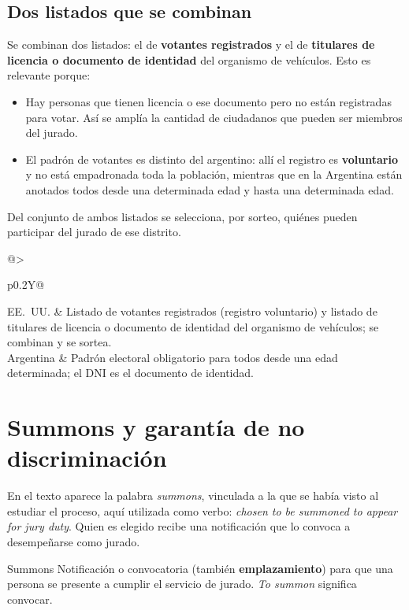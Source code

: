 \documentclass[12pt,oneside]{book}
\begin{document}
\subsection{Dos listados que se combinan}

Se combinan dos listados: el de \textbf{votantes registrados} y el de \textbf{titulares de licencia o documento de identidad} del organismo de vehículos. Esto es relevante porque:
\begin{itemize}
\item Hay personas que tienen licencia o ese documento pero no están registradas para votar. Así se amplía la cantidad de ciudadanos que pueden ser miembros del jurado.
\item El padrón de votantes es distinto del argentino: allí el registro es \textbf{voluntario} y no está empadronada toda la población, mientras que en la Argentina están anotados todos desde una determinada edad y hasta una determinada edad.
\end{itemize}

Del conjunto de ambos listados se selecciona, por sorteo, quiénes pueden participar del jurado de ese distrito.

\begin{table}[H]
\centering
\small
\renewcommand{\arraystretch}{1.25}
\begin{tabularx}{\textwidth}{@{}>{\bfseries\raggedright\arraybackslash}p{}Y@{}}
\toprule
EE.~UU. & Listado de votantes registrados (registro voluntario) y listado de titulares de licencia o documento de identidad del organismo de vehículos; se combinan y se sortea. \\
Argentina & Padrón electoral obligatorio para todos desde una edad determinada; el DNI es el documento de identidad. \\
\bottomrule
\end{tabularx}
\end{table}

\section{Summons y garantía de no discriminación}

En el texto aparece la palabra \textit{summons}, vinculada a la que se había visto al estudiar el proceso, aquí utilizada como verbo: \textit{chosen to be summoned to appear for jury duty}. Quien es elegido recibe una notificación que lo convoca a desempeñarse como jurado.

\begin{definition}{Summons}
Notificación o convocatoria (también \textbf{emplazamiento}) para que una persona se presente a cumplir el servicio de jurado. \textit{To summon} significa convocar.
\end{definition}
\end{document}
